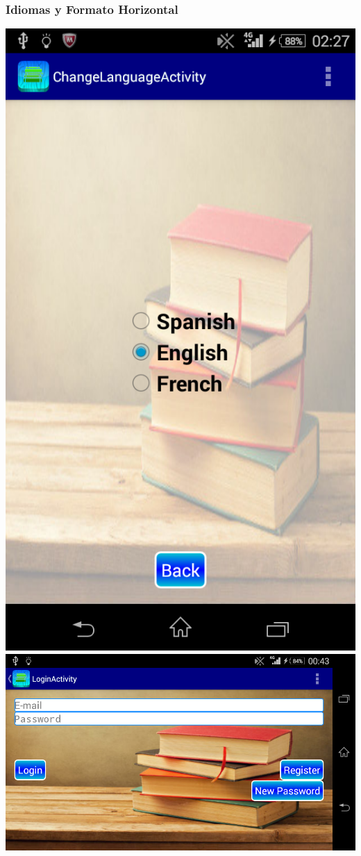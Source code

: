 \begin{frame}
	\frametitle{Idiomas y Formato Horizontal}
	{\inserttitlegraphic\par}
	\hfill \includegraphics[width=0.25\linewidth]{Images/App/ChangeLanguaje}
	\hfill \includegraphics[width=0.5\linewidth]{Images/App/loginLand}
\end{frame}